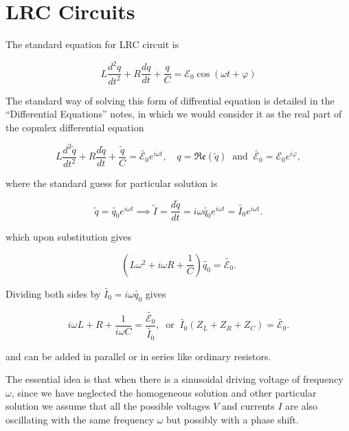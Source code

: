 \documentclass[english,a4paper,12pt]{report}
\begin{document}
\section{LRC Circuits}

The standard equation for LRC circuit is 

\begin{equation}
     L\frac{d^2q}{dt^2} + R\frac{dq}{dt} + \frac{q}{C} = \mathcal{E}_{0}\cos (\omega t + \varphi ) 
\end{equation}

The standard way of solving this form of diffrential equation is detailed in the ``Differential Equations'' notes, in which we would consider it as the real part of the copmlex differential equation

\begin{equation}
    L\frac{d^2\tilde{q} }{dt^2} + R\frac{d\tilde{q} }{dt} + \frac{\tilde{q} }{C} = \tilde{\mathcal{E}_{0} }e^{i \omega t},  \quad q = \mathfrak{Re} (\tilde{q} ) ~\text { and }~ \tilde{\mathcal{E}_{0} } = \mathcal{E}_{0} e^{i \varphi },
\end{equation}

where the standard guess for particular solution is 

\begin{equation}
    \tilde{q}  = \tilde{q_0 }e^{i \omega t} \implies \tilde{I} = \frac{d \tilde{q} }{dt} = i \omega \tilde{q_{0} } e^{i \omega t} = \tilde{I_0 }e^{i \omega t}.    
\end{equation}

which upon substitution gives 

\begin{equation}
    \left( L\omega ^2 + i \omega R + \frac{1}{C}  \right) \tilde{q_0 } = \tilde{\mathcal{E}_{0} }.
\end{equation}

Dividing both sides by \(\tilde{I_{0} } = i \omega \tilde{q_{0} } \) gives 

\begin{equation}
    i \omega L + R + \frac{1}{i \omega C} = \frac{\tilde{\mathcal{E}_{0} } }{\tilde{I_{0} } }, ~\text { or }~ \tilde{I_{0} }(Z_{L} + Z_{R} + Z_{C}  ) = \tilde{\mathcal{E}_{0} }.  
\end{equation}

and can be added in parallel or in series like ordinary resistors. 

The essential idea is that when there is a sinusoidal driving voltage of frequency \(\omega \), since we have neglected the homogeneous solution and other particular solution we assume that all the possible voltages \(V\) and currents \(I\) are also oscillating with the same frequency \(\omega \) but possibly with a phase shift.
\end{document}

